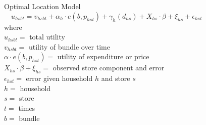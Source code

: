 \documentclass[final]{beamer}
\newlength{\sepwid}
\newlength{\onecolwid}
\newlength{\twocolwid}
\begin{document}
\begin{frame}[t]
\begin{columns}[t]
\begin{column}{\onecolwid}
\begin{alertblock}{Optimal Location Model}
{\small
$$u_{hsbt} = v_{hsbt} + \alpha_{h}\cdot e(b,p_{hst}) + \gamma_{h}(d_{hs}) + X_{hs}\cdot \beta +\xi_{hs}+\epsilon_{hst}$$
where \\
$u_{hsbt} =$ total utility\\
$v_{hsbt} =$ utility of bundle over time\\
$\alpha \cdot e(b,p_{hst}) =$ utility of expenditure or price\\
$X_{hs}\cdot \beta +\xi_{hs} =$ observed store component and error\\
$\epsilon_{hst} =$ error given household $h$ and store $s$ \\
$h =$ household\\
$s =$ store\\
$t =$ times\\
$b =$ bundle\\


}
\end{alertblock} 



\end{column} %

\begin{column}{\sepwid}\end{column} %

\begin{column}{\twocolwid} %


\end{column}
\end{columns}
\end{frame}
\end{document}
